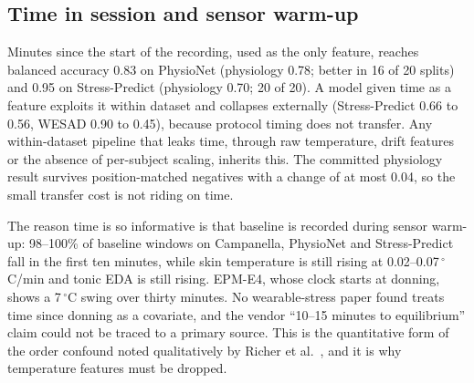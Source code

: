 \documentclass[journal]{IEEEtran}
\begin{document}
\subsection{Time in session and sensor warm-up}
Minutes since the start of the recording, used as the only feature, reaches balanced accuracy 0.83 on PhysioNet (physiology 0.78; better in 16 of 20 splits) and 0.95 on Stress-Predict (physiology 0.70; 20 of 20). A model given time as a feature exploits it within dataset and collapses externally (Stress-Predict 0.66 to 0.56, WESAD 0.90 to 0.45), because protocol timing does not transfer. Any within-dataset pipeline that leaks time, through raw temperature, drift features or the absence of per-subject scaling, inherits this. The committed physiology result survives position-matched negatives with a change of at most 0.04, so the small transfer cost is not riding on time.

The reason time is so informative is that baseline is recorded during sensor warm-up: 98--100\% of baseline windows on Campanella, PhysioNet and Stress-Predict fall in the first ten minutes, while skin temperature is still rising at 0.02--0.07\,$^\circ$C/min and tonic EDA is still rising. EPM-E4, whose clock starts at donning, shows a 7\,$^\circ$C swing over thirty minutes. No wearable-stress paper found treats time since donning as a covariate, and the vendor ``10--15 minutes to equilibrium'' claim could not be traced to a primary source. This is the quantitative form of the order confound noted qualitatively by Richer et al.~\cite{richer2024}, and it is why temperature features must be dropped.
\end{document}
